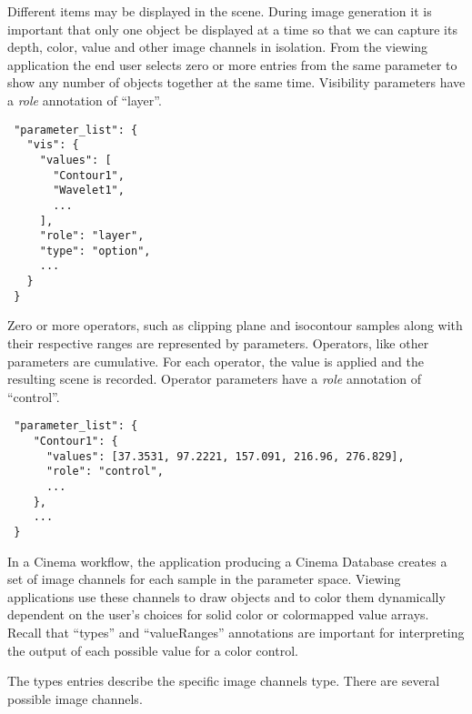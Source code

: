 \label{sec:objects}

Different items may be displayed in the scene. During image generation
it is important that only one object be displayed at a time so that we
can capture its depth, color, value and other image channels in
isolation. From the viewing application the end user selects zero or
more entries from the same parameter to show any number of objects
together at the same time. Visibility parameters have a \textit{role} annotation of ``layer''.

\begin{verbatim}
 "parameter_list": {
   "vis": {
     "values": [
       "Contour1",
       "Wavelet1",
       ...
     ],
     "role": "layer",
     "type": "option",
     ...
   }
 }
\end{verbatim}

\label{sec:operators}

Zero or more operators, such as clipping plane and isocontour samples along with their respective ranges are represented by parameters. Operators, like other parameters are cumulative. For each operator, the value is applied and the resulting scene is recorded. Operator parameters have a \textit{role} annotation of ``control''.

\begin{verbatim}
 "parameter_list": {
    "Contour1": {
      "values": [37.3531, 97.2221, 157.091, 216.96, 276.829],
      "role": "control",
      ...
    },
    ...
 }
\end{verbatim}

\label{sec:image_channels}

In a Cinema workflow, the application producing a Cinema Database creates a set of image channels for each sample in the parameter space. Viewing applications use these channels to draw objects and to color them dynamically dependent on the user's choices for solid color or colormapped value arrays. Recall that ``types'' and ``valueRanges'' annotations are important for interpreting the output of each possible value for a color control.

The types entries describe the specific image channels type. There are several possible image channels.

